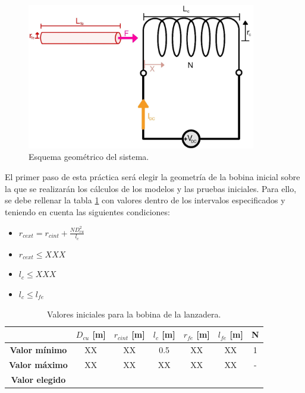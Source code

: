 \begin{figure}[H]
    \centering 
    \includegraphics[width=10cm]{FigurasMemoria/esquemaDesTeor.jpg}
    \caption{Esquema geométrico del sistema.}
    \label{fig:esquemaGeomPractica} %
\end{figure}

El primer paso de esta práctica será elegir la geometría de la bobina inicial sobre la que se realizarán los cálculos de los modelos y las pruebas iniciales. Para ello, se debe rellenar la tabla \ref{tab:bobIniPractica} con valores dentro de los intervalos especificados y teniendo en cuenta las siguientes condiciones:

\begin{itemize}
    \item \(r_{cext} = r_{cint} + \frac{ND_{cu}^2}{l_c}\)
    \item \(r_{cext} \leq XXX\)
    \item \(l_c \leq XXX\)
    \item \(l_c \leq l_{fe}\)
\end{itemize}

\begin{table}[H]
    \centering
    \setlength{\tabcolsep}{5pt}
    \renewcommand{\arraystretch}{1.2}
    \begin{tabular}{|c|c|c|c|c|c|c|}
        \hline
        \hbox{} & \textbf{\(D_{cu}\) [m]} & \textbf{\(r_{cint}\) [m]} & \textbf{\(l_c\) [m]} & \textbf{\(r_{fe}\) [m]} & \textbf{\(l_{fe}\) [m]} & \textbf{N} \\
        \hline
        \textbf{Valor mínimo} & XX & XX & 0.5 & XX & XX & 1 \\
        \textbf{Valor máximo} & XX & XX & XX & XX & XX & - \\
        \textbf{Valor elegido} &  &  &  &  &  &  \\
        \hline
    \end{tabular}
    \caption{Valores iniciales para la bobina de la lanzadera.}
    \label{tab:bobIniPractica}
\end{table}



